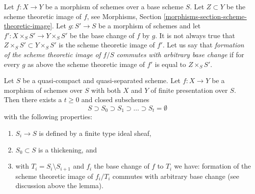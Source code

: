 \noindent
Let $f : X \to Y$ be a morphism of schemes over a base scheme $S$.
Let $Z \subset Y$ be the scheme theoretic image of $f$, see
Morphisms, Section \ref{morphisms-section-scheme-theoretic-image}.
Let $g : S' \to S$ be a morphism of schemes and let
$f' : X \times_S S' \to Y \times_S S'$ be the base change of $f$ by $g$.
It is not always true that $Z \times_S S' \subset Y \times_S S'$
is the scheme theoretic image of $f'$.
Let us say that {\it formation of the scheme theoretic image of $f/S$
commutes with arbitrary base change} if for every $g$ as above
the scheme theoretic image of $f'$ is equal to $Z \times_S S'$.

\begin{lemma}
\label{lemma-base-change-scheme-theoretic-image}
Let $S$ be a quasi-compact and quasi-separated scheme.
Let $f : X \to Y$ be a morphism of schemes over $S$ with
both $X$ and $Y$ of finite presentation over $S$.
Then there exists a $t \geq 0$ and closed subschemes
$$
S \supset S_0 \supset S_1 \supset \ldots \supset S_t = \emptyset
$$
with the following properties:
\begin{enumerate}
\item $S_i \to S$ is defined by a finite type ideal sheaf,
\item $S_0 \subset S$ is a thickening, and
\item with $T_i = S_i \setminus S_{i + 1}$ and $f_i$ the base
change of $f$ to $T_i$ we have:
formation of the scheme theoretic image of $f_i/T_i$
commutes with arbitrary base change (see discussion above the lemma).
\end{enumerate}
\end{lemma}

